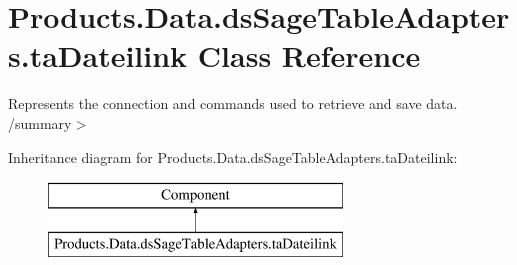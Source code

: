\hypertarget{class_products_1_1_data_1_1ds_sage_table_adapters_1_1ta_dateilink}{}\section{Products.\+Data.\+ds\+Sage\+Table\+Adapters.\+ta\+Dateilink Class Reference}
\label{class_products_1_1_data_1_1ds_sage_table_adapters_1_1ta_dateilink}


Represents the connection and commands used to retrieve and save data. /summary$>$  


Inheritance diagram for Products.\+Data.\+ds\+Sage\+Table\+Adapters.\+ta\+Dateilink\+:\begin{figure}[H]
\begin{center}
\leavevmode
\includegraphics[height=2.000000cm]{class_products_1_1_data_1_1ds_sage_table_adapters_1_1ta_dateilink}
\end{center}
\end{figure}
